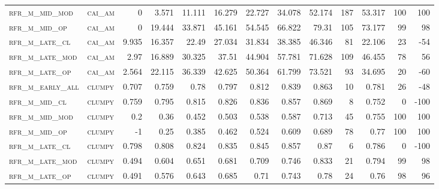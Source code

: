 \begin{landscape}
\begin{center}
\begin{footnotesize}
\begin{longtable}{llrrrrrrrr|rrr}
\textsc{rfr\_m\_mid\_mod  } & \textsc{cai\_am   }   & 0       & 3.571   & 11.111  & 16.279   & 22.727   & 34.078   & 52.174   & 187    & 53.317        & 100           & 100             \\
\textsc{rfr\_m\_mid\_op   } & \textsc{cai\_am   }   & 0       & 19.444  & 33.871  & 45.161   & 54.545   & 66.822   & 79.31    & 105    & 73.177        & 99            & 98              \\
\textsc{rfr\_m\_late\_cl  } & \textsc{cai\_am   }   & 9.935   & 16.357  & 22.49   & 27.034   & 31.834   & 38.385   & 46.346   & 81     & 22.106        & 23            & -54             \\
\textsc{rfr\_m\_late\_mod } & \textsc{cai\_am   }   & 2.97    & 16.889  & 30.325  & 37.51    & 44.904   & 57.781   & 71.628   & 109    & 46.455        & 78            & 56              \\
\textsc{rfr\_m\_late\_op  } & \textsc{cai\_am   }   & 2.564   & 22.115  & 36.339  & 42.625   & 50.364   & 61.799   & 73.521   & 93     & 34.695        & 20            & -60             \\
\textsc{rfr\_m\_early\_all} & \textsc{clumpy    }   & 0.707   & 0.759   & 0.78    & 0.797    & 0.812    & 0.839    & 0.863    & 10     & 0.781         & 26            & -48             \\
\textsc{rfr\_m\_mid\_cl   } & \textsc{clumpy    }   & 0.759   & 0.795   & 0.815   & 0.826    & 0.836    & 0.857    & 0.869    & 8      & 0.752         & 0             & -100            \\
\textsc{rfr\_m\_mid\_mod  } & \textsc{clumpy    }   & 0.2     & 0.36    & 0.452   & 0.503    & 0.538    & 0.587    & 0.713    & 45     & 0.755         & 100           & 100             \\
\textsc{rfr\_m\_mid\_op   } & \textsc{clumpy    }   & -1      & 0.25    & 0.385   & 0.462    & 0.524    & 0.609    & 0.689    & 78     & 0.77          & 100           & 100             \\
\textsc{rfr\_m\_late\_cl  } & \textsc{clumpy    }   & 0.798   & 0.808   & 0.824   & 0.835    & 0.845    & 0.857    & 0.87     & 6      & 0.786         & 0             & -100            \\
\textsc{rfr\_m\_late\_mod } & \textsc{clumpy    }   & 0.494   & 0.604   & 0.651   & 0.681    & 0.709    & 0.746    & 0.833    & 21     & 0.794         & 99            & 98              \\
\textsc{rfr\_m\_late\_op  } & \textsc{clumpy    }   & 0.491   & 0.576   & 0.643   & 0.685    & 0.71     & 0.743    & 0.78     & 24     & 0.76          & 98            & 96              \\

\end{longtable}
\end{footnotesize}
\end{center}
\end{landscape}
